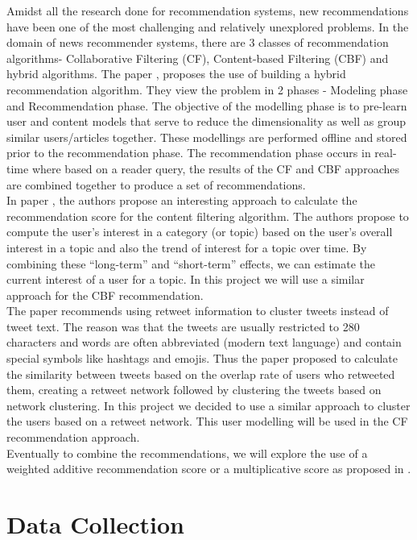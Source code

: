 \documentclass{article}
\begin{document}
Amidst all the research done for recommendation systems, new recommendations have been one of the most challenging and relatively unexplored problems. In the domain of news recommender systems, there are 3 classes of recommendation algorithms- Collaborative Filtering (CF), Content-based Filtering (CBF) and hybrid algorithms. The paper \cite{ref1}, proposes the use of building a hybrid recommendation algorithm. They view the problem in 2 phases - Modeling phase and Recommendation phase. The objective of the modelling phase is to pre-learn user and content models that serve to reduce the dimensionality as well as group similar users/articles together. These modellings are performed offline and stored prior to the recommendation phase. The recommendation phase occurs in real-time where based on a reader query, the results of the CF and CBF approaches are combined together to produce a set of recommendations. \\  
In paper \cite{CBFpaper}, the authors propose an interesting approach to calculate the recommendation score for the content filtering algorithm. The authors propose to compute the user’s interest in a category (or topic) based on the user’s overall interest in a topic and also the trend of interest for a topic over time. By combining these “long-term” and “short-term” effects, we can estimate the current interest of a user for a topic. In this project we will use a similar approach for the CBF recommendation. \\
The paper \cite{userClustering} recommends using retweet information to cluster tweets instead of tweet text. The reason was that the tweets are usually restricted to 280 characters and words are often abbreviated (modern text language) and contain special symbols like hashtags and emojis. Thus the paper proposed to calculate the similarity between tweets based on the overlap rate of users who retweeted them, creating a retweet network followed by clustering the tweets based on network clustering.  In this project we decided to use a similar approach to cluster the users based on a retweet network. This user modelling will be used in the CF recommendation approach. \\
Eventually to combine the recommendations, we will explore the use of a weighted additive recommendation score or a multiplicative score as proposed in \cite{CBFpaper}.

\section{Data Collection}
\end{document}
